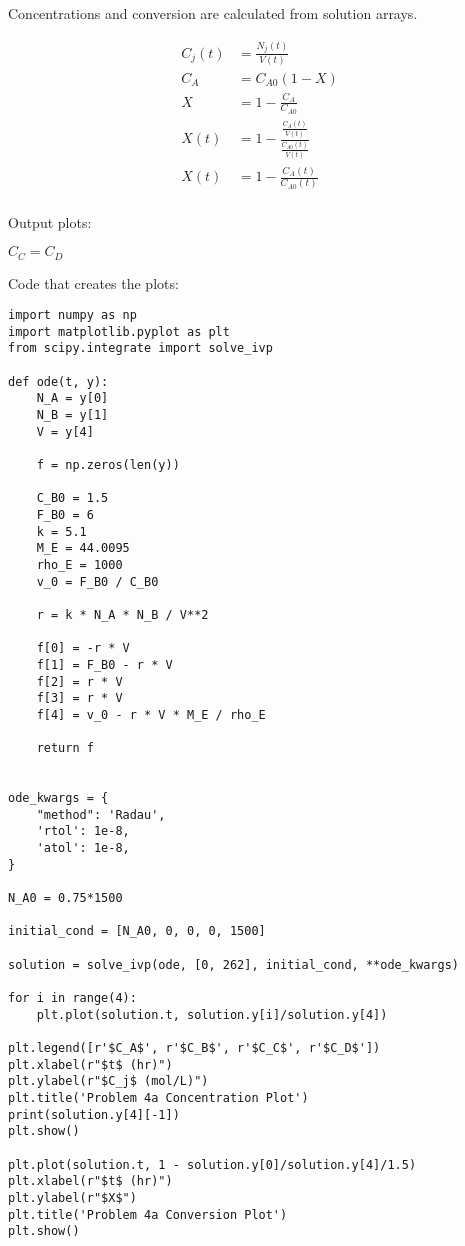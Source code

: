 \documentclass[12pt]{article}
\begin{document}
\begin{enumerate}
    Concentrations and conversion are calculated from solution arrays.

    \begin{align*}
        C_j(t) &= \frac{N_j(t)}{V(t)} \\
        C_A &= C_{A0} (1 - X) \\
        X &= 1 - \frac{C_A}{C_{A0}} \\
        X(t) &= 1 - \frac{\frac{C_A(t)}{V(t)}}{\frac{C_{A0}(t)}{V(t)}} \\
        X(t) &= 1 - \frac{C_A(t)}{C_{A0}(t)} \\
    \end{align*}

    Output plots:

    $C_C = C_D$

    

    

    Code that creates the plots:

\begin{verbatim}
import numpy as np
import matplotlib.pyplot as plt
from scipy.integrate import solve_ivp

def ode(t, y):
    N_A = y[0]
    N_B = y[1]
    V = y[4]
    
    f = np.zeros(len(y))

    C_B0 = 1.5
    F_B0 = 6
    k = 5.1
    M_E = 44.0095
    rho_E = 1000
    v_0 = F_B0 / C_B0

    r = k * N_A * N_B / V**2

    f[0] = -r * V
    f[1] = F_B0 - r * V
    f[2] = r * V
    f[3] = r * V
    f[4] = v_0 - r * V * M_E / rho_E

    return f


ode_kwargs = {
    "method": 'Radau',
    'rtol': 1e-8,
    'atol': 1e-8,
}    

N_A0 = 0.75*1500

initial_cond = [N_A0, 0, 0, 0, 1500]

solution = solve_ivp(ode, [0, 262], initial_cond, **ode_kwargs)

for i in range(4):
    plt.plot(solution.t, solution.y[i]/solution.y[4])

plt.legend([r'$C_A$', r'$C_B$', r'$C_C$', r'$C_D$'])
plt.xlabel(r"$t$ (hr)")
plt.ylabel(r"$C_j$ (mol/L)")
plt.title('Problem 4a Concentration Plot')
print(solution.y[4][-1])
plt.show()

plt.plot(solution.t, 1 - solution.y[0]/solution.y[4]/1.5)
plt.xlabel(r"$t$ (hr)")
plt.ylabel(r"$X$")
plt.title('Problem 4a Conversion Plot')
plt.show()
\end{verbatim}


    
\end{enumerate}
\end{document}
